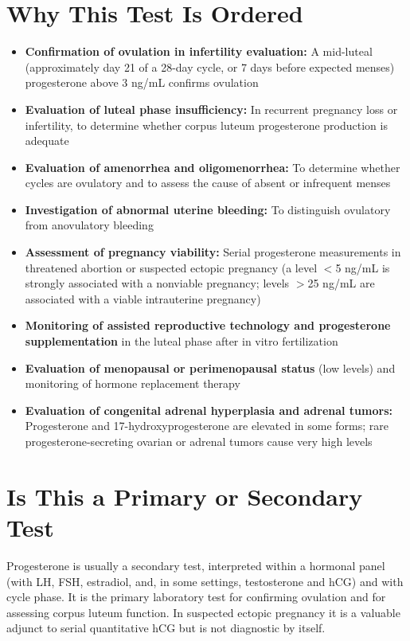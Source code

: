 \section*{Why This Test Is Ordered}
\begin{itemize}
  \item \textbf{Confirmation of ovulation in infertility evaluation:} A mid-luteal (approximately day 21 of a 28-day cycle, or 7 days before expected menses) progesterone above 3 ng/mL confirms ovulation
  \item \textbf{Evaluation of luteal phase insufficiency:} In recurrent pregnancy loss or infertility, to determine whether corpus luteum progesterone production is adequate
  \item \textbf{Evaluation of amenorrhea and oligomenorrhea:} To determine whether cycles are ovulatory and to assess the cause of absent or infrequent menses
  \item \textbf{Investigation of abnormal uterine bleeding:} To distinguish ovulatory from anovulatory bleeding
  \item \textbf{Assessment of pregnancy viability:} Serial progesterone measurements in threatened abortion or suspected ectopic pregnancy (a level $<$5 ng/mL is strongly associated with a nonviable pregnancy; levels $>$25 ng/mL are associated with a viable intrauterine pregnancy)
  \item \textbf{Monitoring of assisted reproductive technology and progesterone supplementation} in the luteal phase after in vitro fertilization
  \item \textbf{Evaluation of menopausal or perimenopausal status} (low levels) and monitoring of hormone replacement therapy
  \item \textbf{Evaluation of congenital adrenal hyperplasia and adrenal tumors:} Progesterone and 17-hydroxyprogesterone are elevated in some forms; rare progesterone-secreting ovarian or adrenal tumors cause very high levels
\end{itemize}

\section*{Is This a Primary or Secondary Test}
Progesterone is usually a secondary test, interpreted within a hormonal panel (with LH, FSH, estradiol, and, in some settings, testosterone and hCG) and with cycle phase. It is the primary laboratory test for confirming ovulation and for assessing corpus luteum function. In suspected ectopic pregnancy it is a valuable adjunct to serial quantitative hCG but is not diagnostic by itself.

